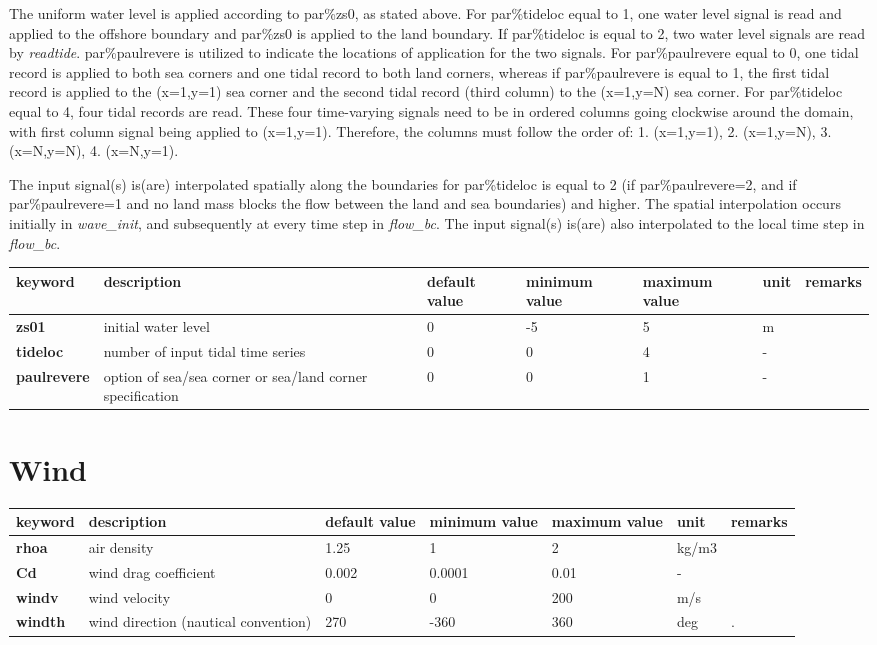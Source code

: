 The uniform water level is applied according to par\%zs0, as stated above. For par\%tideloc equal to 1, one water level signal is read and applied to the offshore boundary and par\%zs0 is applied to the land boundary.  If par\%tideloc is equal to 2, two water level signals are read by \textit{readtide}. par\%paulrevere is utilized to indicate the locations of application for the two signals.  For par\%paulrevere equal to 0, one tidal record is applied to both sea corners and one tidal record to both land corners, whereas if par\%paulrevere is equal to 1, the first tidal record is applied to the (x=1,y=1) sea corner and the second tidal record (third column) to the (x=1,y=N) sea corner. For par\%tideloc equal to 4, four tidal records are read. These four time-varying signals need to be in ordered columns going clockwise around the domain, with first column signal being applied to (x=1,y=1). Therefore, the columns must follow the order of: 1. (x=1,y=1), 2. (x=1,y=N), 3. (x=N,y=N), 4. (x=N,y=1).

The input signal(s) is(are) interpolated spatially along the boundaries for par\%tideloc is equal to 2 (if par\%paulrevere=2, and if par\%paulrevere=1 and no land mass blocks the flow between the land and sea boundaries) and higher. The spatial interpolation occurs initially in \textit{wave\_init}, and subsequently at every time step in \textit{flow\_bc}. The input signal(s) is(are) also interpolated to the local time step in \textit{flow\_bc}.  

\begin{tabular}{|p{0.6in}|p{1.0in}|p{0.4in}|p{0.5in}|p{0.5in}|p{0.3in}|p{0.5in}|} \hline 
keyword & description & default value & minimum value & maximum value & unit & remarks \\ \hline 
\textbf{zs01    } & initial water level & 0 & -5 & 5 & m &  \\ \hline 
\textbf{tideloc  } & number of input tidal time series & 0 & 0 & 4 & - &  \\ \hline 
\textbf{paulrevere  } & option of sea/sea corner or sea/land corner specification & 0 & 0 & 1 & - &  \\ \hline 
\end{tabular}
\section{Wind}

\begin{tabular}{|p{0.6in}|p{0.9in}|p{0.4in}|p{0.5in}|p{0.5in}|p{0.4in}|p{0.5in}|} \hline 
keyword & description & default value & minimum value & maximum value & unit & remarks \\ \hline 
\textbf{rhoa    } & air density & 1.25 & 1 & 2 & kg/m3 &  \\ \hline 
\textbf{Cd      } & wind drag coefficient & 0.002 & 0.0001 & 0.01 & - &  \\ \hline 
\textbf{windv   } & wind velocity & 0 & 0 & 200 & m/s &  \\ \hline 
\textbf{windth  } & wind direction (nautical convention) & 270 & -360 & 360 & deg & . \\ \hline 
\end{tabular}

